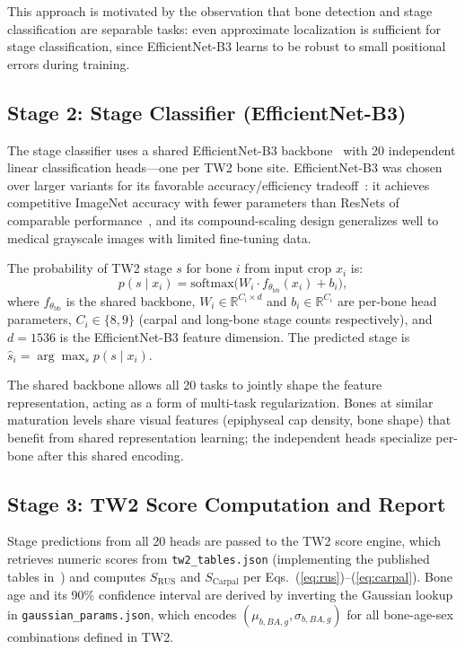 \documentclass[journal]{IEEEtran}
\begin{document}
This approach is motivated by the observation that bone detection
and stage classification are separable tasks: even approximate
localization is sufficient for stage classification, since EfficientNet-B3
learns to be robust to small positional errors during training.

\subsection{Stage 2: Stage Classifier (EfficientNet-B3)}

The stage classifier uses a shared EfficientNet-B3
backbone~\cite{tan2019} with 20 independent linear classification
heads—one per TW2 bone site.
EfficientNet-B3 was chosen over larger variants for its
favorable accuracy/efficiency tradeoff~\cite{tan2019}:
it achieves competitive ImageNet accuracy with fewer parameters
than ResNets of comparable performance~\cite{he2016},
and its compound-scaling design generalizes well to medical
grayscale images with limited fine-tuning data.

The probability of TW2 stage $s$ for bone $i$ from input crop
$x_i$ is:
\begin{equation}
  p(s \mid x_i) = \text{softmax}\bigl(W_i \cdot
    f_{\theta_{\text{bb}}}(x_i) + b_i\bigr),
  \label{eq:head}
\end{equation}
where $f_{\theta_{\text{bb}}}$ is the shared backbone,
$W_i \in \mathbb{R}^{C_i \times d}$ and $b_i \in \mathbb{R}^{C_i}$
are per-bone head parameters,
$C_i \in \{8, 9\}$ (carpal and long-bone stage counts respectively),
and $d = 1536$ is the EfficientNet-B3 feature dimension.
The predicted stage is $\hat{s}_i = \arg\max_s p(s \mid x_i)$.

The shared backbone allows all 20 tasks to jointly shape the
feature representation, acting as a form of multi-task regularization.
Bones at similar maturation levels share visual features (epiphyseal
cap density, bone shape) that benefit from shared representation
learning; the independent heads specialize per-bone after
this shared encoding.

\subsection{Stage 3: TW2 Score Computation and Report}

Stage predictions from all 20 heads are passed to the TW2 score
engine, which retrieves numeric scores from
\texttt{tw2\_tables.json} (implementing the published tables
in~\cite{tanner1983}) and computes $S_{\text{RUS}}$ and
$S_{\text{Carpal}}$ per Eqs.~(\ref{eq:rus})--(\ref{eq:carpal}).
Bone age and its 90\% confidence interval are derived by
inverting the Gaussian lookup in \texttt{gaussian\_params.json},
which encodes $(\mu_{b,BA,g}, \sigma_{b,BA,g})$ for all
bone-age-sex combinations defined in TW2.
\end{document}
